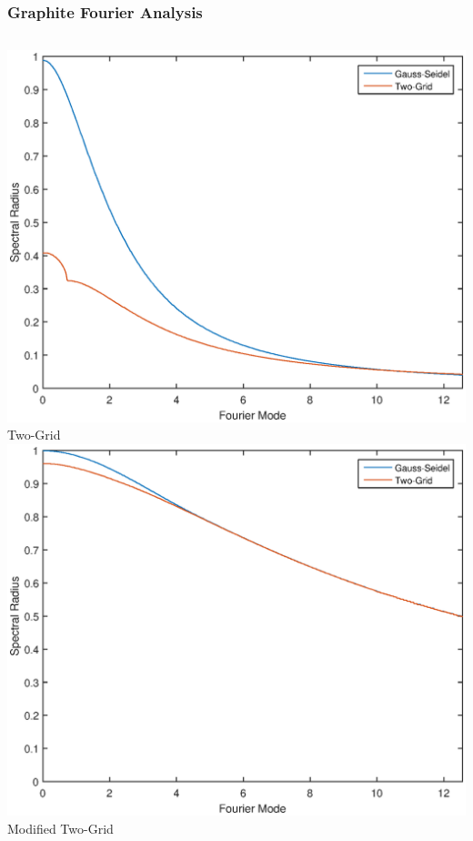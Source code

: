 \documentclass[compress,10pt]{beamer}
\begin{document}
\begin{frame}[t]\frametitle{\small Graphite Fourier Analysis}
{
\vspace{1cm}
\begin{columns}
\centering
\includegraphics[width=1.00\textwidth]{images/FA_graphite_TG.eps}\\
Two-Grid
\centering
\includegraphics[width=1.00\textwidth]{images/FA_graphite_MTG.eps}\\
Modified Two-Grid
\end{columns}
}
{
}
\end{frame}
\end{document}
